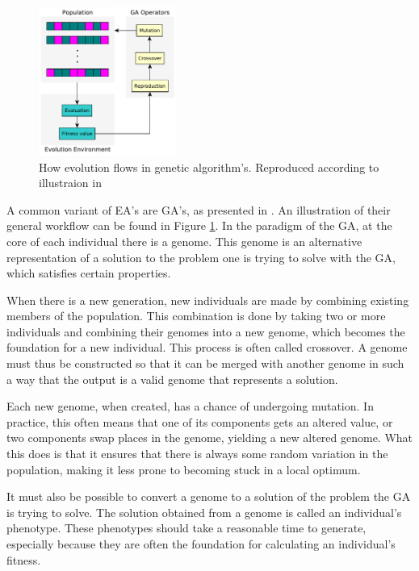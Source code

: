 \begin{figure}
    \begin{center}
        \includegraphics[width=0.4\textwidth]{figures/GA_general_flow_illustration.pdf}
    \end{center}
    \caption{How evolution flows in genetic algorithm's. Reproduced according to illustraion in \citet{gaFlowIllustrationSource}}
    \label{fig:ga_flow_illustraion}
\end{figure}


A common variant of EA's are GA's, as presented in \citet{holland1975originalGA}. An illustration of their general workflow can be found in Figure \ref{fig:ga_flow_illustraion}. In the paradigm of the GA, at the core of each individual there is a genome. This genome is an alternative representation of a solution to the problem one is trying to solve with the GA, which satisfies certain properties.

When there is a new generation, new individuals are made by combining existing members of the population. This combination is done by taking two or more individuals and combining their genomes into a new genome, which becomes the foundation for a new individual. This process is often called crossover. A genome must thus be constructed so that it can be merged with another genome in such a way that the output is a valid genome that represents a solution.

Each new genome, when created, has a chance of undergoing mutation. In practice, this often means that one of its components gets an altered value, or two components swap places in the genome, yielding a new altered genome. What this does is that it ensures that there is always some random variation in the population, making it less prone to becoming stuck in a local optimum.

It must also be possible to convert a genome to a solution of the problem the GA is trying to solve. The solution obtained from a genome is called an individual's phenotype. These phenotypes should take a reasonable time to generate, especially because they are often the foundation for calculating an individual's fitness.

